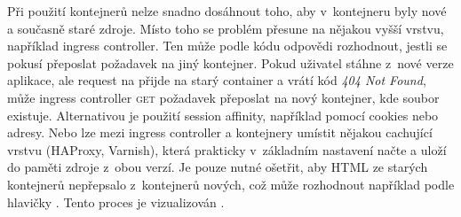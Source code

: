         Při použití kontejnerů nelze snadno dosáhnout toho, aby v~kontejneru byly nové a současně staré zdroje. Místo toho se problém přesune na nějakou vyšší vrstvu, například ingress controller. Ten může podle \HTTP kódu odpovědi rozhodnout, jestli se pokusí přeposlat požadavek na jiný kontejner. Pokud uživatel stáhne \HTML z~nové verze aplikace, ale request na  přijde na starý container a vrátí kód \textit{404 Not Found}, může ingress controller \textsc{get} požadavek přeposlat na nový kontejner, kde soubor existuje. Alternativou je použití session affinity, například pomocí cookies nebo  adresy. Nebo lze mezi ingress controller a kontejnery umístit nějakou cachující \HTTP vrstvu (HAProxy, Varnish), která prakticky v~základním nastavení načte a uloží do paměti zdroje z~obou verzí. Je pouze nutné ošetřit, aby HTML ze starých kontejnerů nepřepsalo \HTML z~kontejnerů nových, což může rozhodnout například podle hlavičky . Tento proces je vizualizován .

